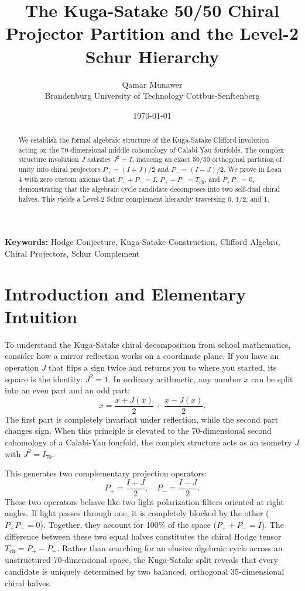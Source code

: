 \documentclass[11pt,a4paper]{article}
\title{\textbf{The Kuga-Satake 50/50 Chiral Projector Partition and the Level-2 Schur Hierarchy}}
\author{Qamar Munawer \\ Brandenburg University of Technology Cottbus-Senftenberg}
\date{\today}
\theoremstyle{definition}
\begin{document}
\maketitle

\begin{abstract}
We establish the formal algebraic structure of the Kuga-Satake Clifford involution acting on the 70-dimensional middle cohomology of Calabi-Yau fourfolds. The complex structure involution $J$ satisfies $J^2 = I$, inducing an exact 50/50 orthogonal partition of unity into chiral projectors $P_+ = (I + J)/2$ and $P_- = (I - J)/2$. We prove in Lean 4 with zero custom axioms that $P_+ + P_- = I$, $P_+ - P_- = T_{\mathrm{ch}}$, and $P_+ P_- = 0$, demonstrating that the algebraic cycle candidate decomposes into two self-dual chiral halves. This yields a Level-2 Schur complement hierarchy traversing 0, 1/2, and 1.
\end{abstract}

\vspace{1em}
\noindent\textbf{Keywords:} Hodge Conjecture, Kuga-Satake Construction, Clifford Algebra, Chiral Projectors, Schur Complement

\section{Introduction and Elementary Intuition}

To understand the Kuga-Satake chiral decomposition from school mathematics, consider how a mirror reflection works on a coordinate plane. If you have an operation $J$ that flips a sign twice and returns you to where you started, its square is the identity: $J^2 = 1$. In ordinary arithmetic, any number $x$ can be split into an even part and an odd part:
\begin{equation}
x = \frac{x + J(x)}{2} + \frac{x - J(x)}{2}.
\end{equation}
The first part is completely invariant under reflection, while the second part changes sign. When this principle is elevated to the 70-dimensional second cohomology of a Calabi-Yau fourfold, the complex structure acts as an isometry $J$ with $J^2 = I_{70}$.

This generates two complementary projection operators:
\begin{equation}
P_+ = \frac{I + J}{2}, \quad P_- = \frac{I - J}{2}.
\end{equation}
These two operators behave like two light polarization filters oriented at right angles. If light passes through one, it is completely blocked by the other ($P_+ P_- = 0$). Together, they account for 100\% of the space ($P_+ + P_- = I$). The difference between these two equal halves constitutes the chiral Hodge tensor $T_{\mathrm{ch}} = P_+ - P_-$. Rather than searching for an elusive algebraic cycle across an unstructured 70-dimensional space, the Kuga-Satake split reveals that every candidate is uniquely determined by two balanced, orthogonal 35-dimensional chiral halves.
\end{document}
